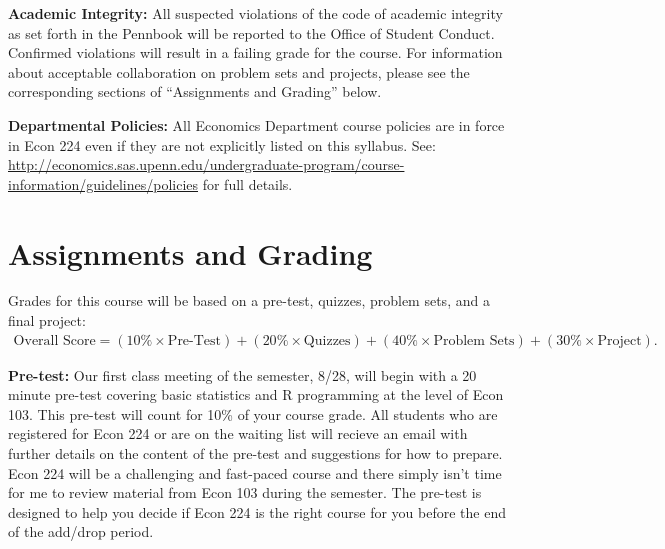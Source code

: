 \documentclass[11pt, letterpaper]{article}
\begin{document}
\medskip

\noindent \textbf{Academic Integrity:} 
All suspected violations of the code of academic integrity as set forth in the Pennbook will be reported to the Office of Student Conduct. 
Confirmed violations will result in a failing grade for the course. 
For information about acceptable collaboration on problem sets and projects, please see the corresponding sections of ``Assignments and Grading'' below.

\medskip

\noindent \textbf{Departmental Policies: } 
All Economics Department course policies are in force in Econ 224 even if they are not explicitly listed on this syllabus. 
See: \url{http://economics.sas.upenn.edu/undergraduate-program/course-information/guidelines/policies} for full details. 

\medskip





\section*{Assignments and Grading}

Grades for this course will be based on a pre-test, quizzes, problem sets, and a final project:
	\begin{equation*}
	\begin{split}
    \mbox{Overall Score} = (10\% \times \mbox{Pre-Test})  + (20\% \times \mbox{Quizzes}) + (40\% \times \mbox{Problem Sets}) +  (30\% \times \mbox{Project}).
	\end{split}
	\end{equation*}

\medskip 


\noindent \textbf{Pre-test:} Our first class meeting of the semester, 8/28, will begin with a 20 minute pre-test covering basic statistics and R programming at the level of Econ 103.
This pre-test will count for 10\% of your course grade.
All students who are registered for Econ 224 or are on the waiting list will recieve an email with further details on the content of the pre-test and suggestions for how to prepare.
Econ 224 will be a challenging and fast-paced course and there simply isn't time for me to review material from Econ 103 during the semester.
The pre-test is designed to help you decide if Econ 224 is the right course for you before the end of the add/drop period.

\medskip
\end{document}
